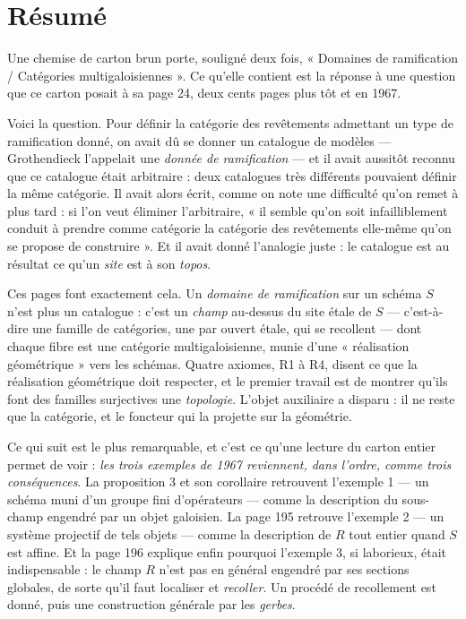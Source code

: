 \documentclass[11pt,a4paper]{article}
\begin{document}
\section*{Résumé}

\begin{resume}
Une chemise de carton brun porte, souligné deux fois, « Domaines de
ramification / Catégories multigaloisiennes ». Ce qu'elle contient est la
réponse à une question que ce carton posait à sa page 24, deux cents pages plus
tôt et en 1967.

Voici la question. Pour définir la catégorie des revêtements admettant un type
de ramification donné, on avait dû se donner un catalogue de modèles ---
Grothendieck l'appelait une \emph{donnée de ramification} --- et il avait
aussitôt reconnu que ce catalogue était arbitraire : deux catalogues très
différents pouvaient définir la même catégorie. Il avait alors écrit, comme on
note une difficulté qu'on remet à plus tard : si l'on veut éliminer
l'arbitraire, « il semble qu'on soit infailliblement conduit à prendre comme
catégorie la catégorie des revêtements elle-même qu'on se propose de
construire ». Et il avait donné l'analogie juste : le catalogue est au
résultat ce qu'un \emph{site} est à son \emph{topos}.

Ces pages font exactement cela. Un \emph{domaine de ramification} sur un schéma
$S$ n'est plus un catalogue : c'est un \emph{champ} au-dessus du site étale de
$S$ --- c'est-à-dire une famille de catégories, une par ouvert étale, qui se
recollent --- dont chaque fibre est une catégorie multigaloisienne, munie d'une
« réalisation géométrique » vers les schémas. Quatre axiomes, R1 à R4, disent
ce que la réalisation géométrique doit respecter, et le premier travail est de
montrer qu'ils font des familles surjectives une \emph{topologie}. L'objet
auxiliaire a disparu : il ne reste que la catégorie, et le foncteur qui la
projette sur la géométrie.

Ce qui suit est le plus remarquable, et c'est ce qu'une lecture du carton
entier permet de voir : \emph{les trois exemples de 1967 reviennent, dans
l'ordre, comme trois conséquences}. La proposition 3 et son corollaire
retrouvent l'exemple 1 --- un schéma muni d'un groupe fini d'opérateurs ---
comme la description du sous-champ engendré par un objet galoisien. La page 195
retrouve l'exemple 2 --- un système projectif de tels objets --- comme la
description de $R$ tout entier quand $S$ est affine. Et la page 196 explique
enfin pourquoi l'exemple 3, si laborieux, était indispensable : le champ $R$
n'est pas en général engendré par ses sections globales, de sorte qu'il faut
localiser et \emph{recoller}. Un procédé de recollement est donné, puis une
construction générale par les \emph{gerbes}.


\end{resume}
\end{document}
